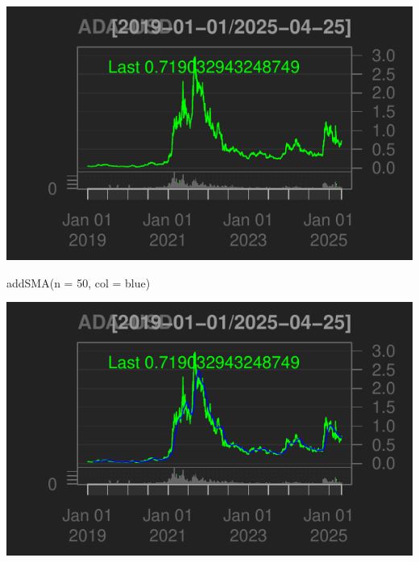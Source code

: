 \documentclass[]{tufte-handout}
\newenvironment{Shaded}{}{}
\newcommand{\AttributeTok}[1]{\textcolor[rgb]{0.49,0.56,0.16}{#1}}
\newcommand{\DecValTok}[1]{\textcolor[rgb]{0.25,0.63,0.44}{#1}}
\newcommand{\FunctionTok}[1]{\textcolor[rgb]{0.02,0.16,0.49}{#1}}
\newcommand{\NormalTok}[1]{#1}
\newcommand{\StringTok}[1]{\textcolor[rgb]{0.25,0.44,0.63}{#1}}
\begin{document}
\includegraphics{cripto_update_files/figure-latex/unnamed-chunk-7-1}

\begin{Shaded}
\begin{Highlighting}[]
\FunctionTok{addSMA}\NormalTok{(}\AttributeTok{n =} \DecValTok{50}\NormalTok{, }\AttributeTok{col =} \StringTok{\textquotesingle{}blue\textquotesingle{}}\NormalTok{)}
\end{Highlighting}
\end{Shaded}

\includegraphics{cripto_update_files/figure-latex/unnamed-chunk-7-2}
\end{document}
